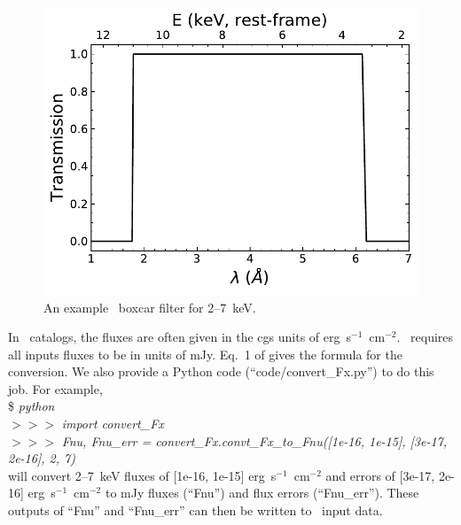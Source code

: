 \begin{figure}[ht]
\centering
\includegraphics[width=0.6\columnwidth]{pdfanalysis/boxcar.pdf}
\caption[An example \xray\ boxcar filter for 2--7~keV]{An example \xray\ boxcar filter for 2--7~keV.}
\label{fig:boxcar}
\end{figure}

In \xray\ catalogs, the fluxes are often given in the cgs units of erg~s$^{-1}$~cm$^{-2}$. 
\xcig\ requires all inputs fluxes to be in units of mJy. 
Eq.~1 of \cite{yang20} gives the formula for the conversion. 
We also provide a Python code (``code/convert\_Fx.py'') to do this job. 
For example, \\
\$ \textit{python} \\
$>>>$ \textit{import convert\_Fx} \\
$>>>$ \textit{Fnu, Fnu\_err = convert\_Fx.convt\_Fx\_to\_Fnu([1e-16, 1e-15], [3e-17, 2e-16], 2, 7)} \\
will convert \hbox{2--7}~keV fluxes of [1e-16, 1e-15] erg~s$^{-1}$~cm$^{-2}$ and errors of [3e-17, 2e-16] erg~s$^{-1}$~cm$^{-2}$ to mJy fluxes (``Fnu'') and flux errors (``Fnu\_err''). 
These outputs of ``Fnu'' and ``Fnu\_err'' can then be written to \xcig\ input data.

